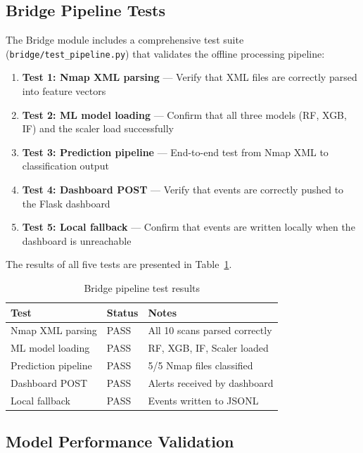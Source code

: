 \documentclass[12pt,a4paper]{report}
\begin{document}
\subsection{Bridge Pipeline Tests}

The Bridge module includes a comprehensive test suite (\texttt{bridge/test\_pipeline.py}) that validates the offline processing pipeline:

\begin{enumerate}
    \item \textbf{Test 1: Nmap XML parsing} --- Verify that XML files are correctly parsed into feature vectors
    \item \textbf{Test 2: ML model loading} --- Confirm that all three models (RF, XGB, IF) and the scaler load successfully
    \item \textbf{Test 3: Prediction pipeline} --- End-to-end test from Nmap XML to classification output
    \item \textbf{Test 4: Dashboard POST} --- Verify that events are correctly pushed to the Flask dashboard
    \item \textbf{Test 5: Local fallback} --- Confirm that events are written locally when the dashboard is unreachable
\end{enumerate}

The results of all five tests are presented in Table~\ref{tab:unit_tests}.

\begin{table}[H]
\centering
\caption{Bridge pipeline test results}
\label{tab:unit_tests}
\begin{tabular}{lll}
\toprule
\textbf{Test} & \textbf{Status} & \textbf{Notes} \\
\midrule
Nmap XML parsing & PASS & All 10 scans parsed correctly \\
ML model loading & PASS & RF, XGB, IF, Scaler loaded \\
Prediction pipeline & PASS & 5/5 Nmap files classified \\
Dashboard POST & PASS & Alerts received by dashboard \\
Local fallback & PASS & Events written to JSONL \\
\bottomrule
\end{tabular}
\end{table}

\subsection{Model Performance Validation}
\end{document}
